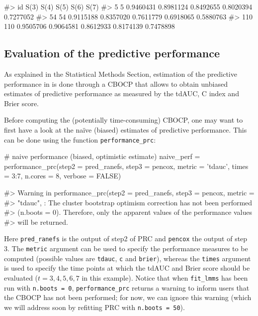 \begin{Schunk}
\begin{Soutput}
#>      id      S(3)      S(4)      S(5)      S(6)      S(7)
#> 5     5 0.9460431 0.8981124 0.8492655 0.8020394 0.7277052
#> 54   54 0.9115188 0.8357020 0.7611779 0.6918065 0.5880763
#> 110 110 0.9505706 0.9064581 0.8612933 0.8174139 0.7478898
\end{Soutput}
\end{Schunk}

\subsection{Evaluation of the predictive
performance}\label{evaluation-of-the-predictive-performance-1}

As explained in the Statistical Methods Section, estimation of the
predictive performance in  is done through a CBOCP that
allows to obtain unbiased estimates of predictive performance as
measured by the tdAUC, C index and Brier score.

Before computing the (potentially time-consuming) CBOCP, one may want to
first have a look at the naïve (biased) estimates of predictive
performance. This can be done using the function
\texttt{performance\_prc}:

\begin{Schunk}
\begin{Sinput}
# naive performance (biased, optimistic estimate)
naive_perf = performance_prc(step2 = pred_ranefs, step3 = pencox, metric = 'tdauc',
                             times = 3:7, n.cores = 8, verbose = FALSE)
\end{Sinput}
\begin{Soutput}
#> Warning in performance_prc(step2 = pred_ranefs, step3 = pencox, metric =
#> "tdauc", : The cluster bootstrap optimism correction has not been performed
#> (n.boots = 0). Therefore, only the apparent values of the performance values
#> will be returned.
\end{Soutput}
\end{Schunk}

Here \texttt{pred\_ranefs} is the output of step2 of PRC and
\texttt{pencox} the output of step 3. The \texttt{metric} argument can
be used to specify the performance measures to be computed (possible
values are \texttt{tdauc}, \texttt{c} and \texttt{brier}), whereas the
\texttt{times} argument is used to specify the time points at which the
tdAUC and Brier score should be evaluated (\(t = 3, 4, 5, 6, 7\) in this
example). Notice that when \texttt{fit\_lmms} has been run with
\texttt{n.boots\ =\ 0}, \texttt{performance\_prc} returns a warning to
inform users that the CBOCP has not been performed; for now, we can
ignore this warning (which we will address soon by refitting PRC with
\texttt{n.boots\ =\ 50}).

